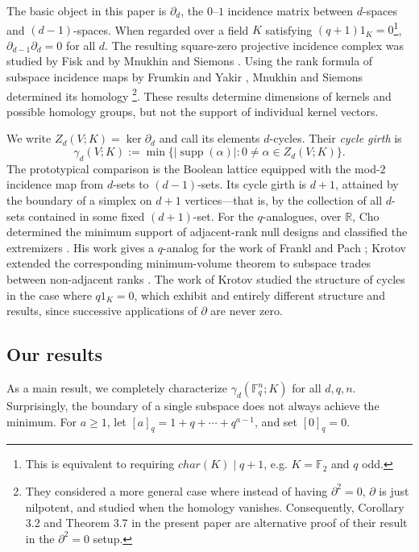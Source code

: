 \documentclass[11pt]{article}
\numberwithin{equation}{section}
\newcommand{\F}{\mathbb F}
\begin{document}
The basic object in this paper is $\partial_d$, the $0$--$1$ incidence matrix between $d$-spaces and $(d-1)$-spaces.
When regarded over a field $K$ satisfying $(q+1)1_K=0$\footnote{This is equivalent to requiring $char(K) \mid q+1$, e.g. $K=\mathbb{F}_2$ and $q$ odd.},  $\partial_{d-1}\partial_d=0$ for all $d$. The resulting square-zero projective incidence complex was studied by Fisk and by Mnukhin and Siemons \cite{Fisk1997,MnukhinSiemons2000}. Using the rank formula of subspace incidence maps by Frumkin and Yakir \cite{FrumkinYakir1990}, Mnukhin and Siemons determined its homology \cite{MnukhinSiemons2000} \footnote{They considered a more general case where instead of having $\partial^2=0$, $\partial$ is just nilpotent, and studied when the homology vanishes. Consequently, Corollary 3.2 and Theorem 3.7 in the present paper are alternative proof of their result in the $\partial^2=0$ setup.}. These results determine dimensions of kernels and possible homology groups, but not the support of individual kernel vectors.

We write $Z_d(V;K)=\ker\partial_d$ and call its elements $d$-cycles. Their \emph{cycle girth} is
\[
    \gamma_d(V;K)
    :=
    \min\bigl\{
        |\operatorname{supp}(\alpha)|:
        0\neq\alpha\in Z_d(V;K)
    \bigr\}.
\]
The prototypical comparison is the Boolean lattice equipped with the mod-$2$ incidence map from $d$-sets to $(d-1)$-sets. Its cycle girth is $d+1$, attained by the boundary of a simplex on $d+1$ vertices---that is, by the collection of all $d$-sets contained in some fixed $(d+1)$-set. For the $q$-analogues, over $\mathbb R$, Cho determined the minimum support of adjacent-rank null designs and classified the extremizers \cite{Cho1998,Cho1999}. His work gives a $q$-analog for the work of Frankl and Pach \cite{FranklPach1983NullDesign}; Krotov extended the corresponding minimum-volume theorem to subspace trades between non-adjacent ranks \cite{Krotov2017}. The work of Krotov \cite{Krotov2020NullDesigns} studied the structure of cycles in the case where $q 1_K = 0$, which exhibit and entirely different structure and results, since successive applications of $\partial$ are never zero.

\subsection{Our results}

As a main result, we completely characterize $\gamma_d(\F_q^n;K)$ for all $d,q,n$. Surprisingly, the boundary of a single subspace does not always achieve the minimum. For $a\ge1$, let $[a]_q=1+q+\cdots+q^{a-1}$, and set $[0]_q=0$.
\end{document}

